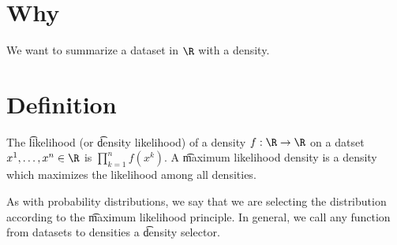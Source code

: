 
\section*{Why}

We want to summarize a dataset in $\R$ with a density.

\section*{Definition}

The \t{likelihood} (or \t{density likelihood}) of a density $f: \R  \to \R$ on a datset $x^1, \dots , x^n \in \R$ is $\prod_{k = 1}^{n} f(x^k)$.
A \t{maximum likelihood density} is a density which maximizes the likelihood among all densities.

As with probability distributions, we say that we are selecting the distribution according to the \t{maximum likelihood principle}.
In general, we call any function from datasets to densities a \t{density selector}.

\blankpage